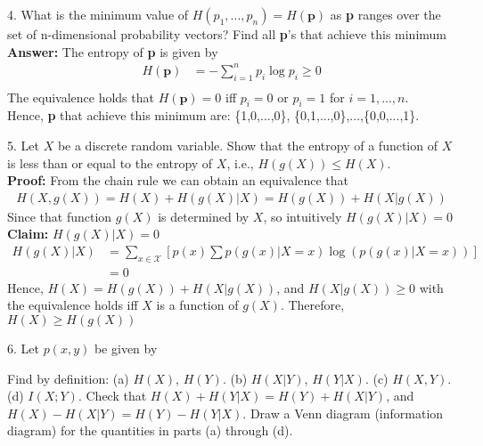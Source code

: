 \documentclass[12pt]{article}
\begin{document}
	4. What is the minimum value of $H(p_1,...,p_n) = H(\textbf{p})$ as \textbf{p} ranges over the set of n-dimensional probability vectors? Find all \textbf{p}'s that achieve this minimum \\
	\textbf{Answer:} The entropy of \textbf{p} is given by
	\begin{align*}
		H(\textbf{p}) &= -\sum_{i=1}^{n}p_i\log p_i \geq 0\\
	\end{align*}
	The equivalence holds that $H(\textbf{p}) = 0$ iff $p_i=0$ or $p_i=1$ for $i = 1,...,n$. \\
	Hence, \textbf{p} that achieve this minimum are: \{1,0,...,0\}, \{0,1,...,0\},...,\{0,0,...,1\}. \\
	\par 
	5. Let $X$ be a discrete random variable. Show that the entropy of a function of $X$ is less than or equal to the entropy of $X$, i.e., $H(g(X)) \leq H(X)$. \\
	\textbf{Proof:} From the chain rule we can obtain an equivalence that 
	\begin{align*}
		H(X, g(X)) = H(X) + H(g(X)|X) = H(g(X)) + H(X|g(X))
	\end{align*}
	Since that function $g(X)$ is determined by $X$, so intuitively $H(g(X)|X) = 0$\\
	\textbf{Claim:} $H(g(X)|X) = 0$ 
	\begin{align*}
		H(g(X)|X) &= \sum_{x\in\mathcal{X}}[p(x)\sum p(g(x)|X=x)\log(p(g(x)|X=x))] \\
		&= 0 
	\end{align*}
	Hence, $H(X) = H(g(X)) + H(X|g(X))$, and $H(X|g(X)) \geq 0$ with the equivalence holds iff $X$ is a function of $g(X)$. Therefore, $H(X) \geq H(g(X))$\\
	\par 
	6. Let $p(x,y)$ be given by
	\begin{table}[H]
		\centering
	\end{table}
	Find by definition: (a) $H(X)$, $H(Y)$. (b) $H(X|Y)$, $H(Y|X)$. (c) $H(X,Y)$. (d) $I(X;Y)$. Check that $H(X)+H(Y|X)=H(Y)+H(X|Y)$, and $H(X)-H(X|Y) = H(Y)-H(Y|X)$. Draw a Venn diagram (information diagram) for the quantities in parts (a) through (d). \\
\end{document}
